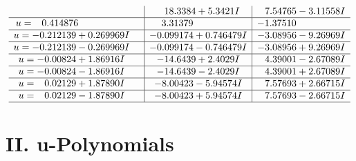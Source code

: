 \documentclass[1p]{elsarticle_modified}
\theoremstyle{definition}
\begin{document}
$$\begin{array}{c|c|c}
 & \phantom{-}18.3384 + 5.3421 I & \phantom{-}7.54765 - 3.11558 I \\ \hline\begin{aligned}
u &= \phantom{-}0.414876\phantom{ +0.000000I}\end{aligned}
 & \phantom{-}3.31379\phantom{ +0.000000I} & -1.37510\phantom{ +0.000000I} \\ \hline\begin{aligned}
u &= -0.212139 + 0.269969 I\end{aligned}
 & -0.099174 + 0.746479 I & -3.08956 - 9.26969 I \\ \hline\begin{aligned}
u &= -0.212139 - 0.269969 I\end{aligned}
 & -0.099174 - 0.746479 I & -3.08956 + 9.26969 I \\ \hline\begin{aligned}
u &= -0.00824 + 1.86916 I\end{aligned}
 & -14.6439 + 2.4029 I & \phantom{-}4.39001 - 2.67089 I \\ \hline\begin{aligned}
u &= -0.00824 - 1.86916 I\end{aligned}
 & -14.6439 - 2.4029 I & \phantom{-}4.39001 + 2.67089 I \\ \hline\begin{aligned}
u &= \phantom{-}0.02129 + 1.87890 I\end{aligned}
 & -8.00423 - 5.94574 I & \phantom{-}7.57693 + 2.66715 I \\ \hline\begin{aligned}
u &= \phantom{-}0.02129 - 1.87890 I\end{aligned}
 & -8.00423 + 5.94574 I & \phantom{-}7.57693 - 2.66715 I\\
 \hline 
 \end{array}$$\newpage
\newpage\renewcommand{\arraystretch}{1}
\centering \section*{ II. u-Polynomials}
\end{document}
